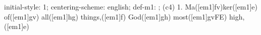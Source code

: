 initial-style: 1;
centering-scheme: english;
def-m1: \grealign;
(c4) 1. Ma([em1]fv)ker([em1]e) of([em1]gv) all([em1]hg) things,([em1]f) God([em1]gh) most([em1]gvFE) high,([em1]e)
